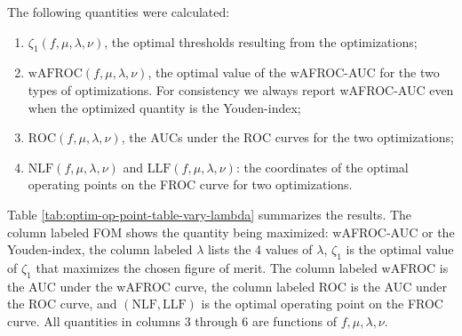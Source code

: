 \documentclass[
]{book}
\begin{document}
The following quantities were calculated:

\begin{enumerate}
\def\labelenumi{\arabic{enumi}.}
\item
  \(\zeta_{1} \left ( f, \mu, \lambda, \nu \right )\), the optimal thresholds resulting from the optimizations;
\item
  \(\text{wAFROC} \left (f, \mu, \lambda, \nu \right )\), the optimal value of the wAFROC-AUC for the two types of optimizations. For consistency we always report wAFROC-AUC even when the optimized quantity is the Youden-index;
\item
  \(\text{ROC} \left (f, \mu, \lambda, \nu \right )\), the AUCs under the ROC curves for the two optimizations;
\item
  \(\text{NLF} \left (f, \mu, \lambda, \nu \right )\) and \(\text{LLF} \left (f, \mu, \lambda, \nu \right )\): the coordinates of the optimal operating points on the FROC curve for two optimizations.
\end{enumerate}

Table \ref{tab:optim-op-point-table-vary-lambda} summarizes the results. The column labeled FOM shows the quantity being maximized: wAFROC-AUC or the Youden-index, the column labeled \(\lambda\) lists the 4 values of \(\lambda\), \(\zeta_1\) is the optimal value of \(\zeta_1\) that maximizes the chosen figure of merit. The column labeled wAFROC is the AUC under the wAFROC curve, the column labeled ROC is the AUC under the ROC curve, and \(\left( \text{NLF}, \text{LLF}\right)\) is the optimal operating point on the FROC curve. All quantities in columns 3 through 6 are functions of \(f, \mu, \lambda, \nu\).

\begin{table}[H]

\caption{\label{tab:optim-op-point-table-vary-lambda}Summary of optimization results for $\mu = 2$, $\nu = 0.9$ and 4 values of $\lambda$.}
\centering
{}
\end{table}
\end{document}
